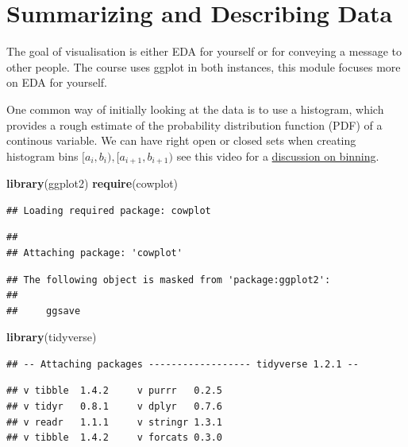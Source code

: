 \documentclass[]{book}
\newenvironment{Shaded}{\begin{snugshade}}{\end{snugshade}}
\newcommand{\KeywordTok}[1]{\textcolor[rgb]{0.13,0.29,0.53}{\textbf{#1}}}
\newcommand{\NormalTok}[1]{#1}
\theoremstyle{definition}
\theoremstyle{definition}
\theoremstyle{definition}
\theoremstyle{remark}
\begin{document}
\section{Summarizing and Describing
Data}\label{summarizing-and-describing-data}

The goal of visualisation is either EDA for yourself or for conveying a
message to other people. The course uses ggplot in both instances, this
module focuses more on EDA for yourself.

One common way of initially looking at the data is to use a histogram,
which provides a rough estimate of the probability distribution function
(PDF) of a continous variable. We can have right open or closed sets
when creating histogram bins \([a_i,b_i), [a_{i+1},b_{i+1})\) see this
video for a \href{https://youtu.be/kREoWbByNZs}{discussion on binning}.

\begin{Shaded}
\begin{Highlighting}[]
\KeywordTok{library}\NormalTok{(ggplot2)}
\KeywordTok{require}\NormalTok{(cowplot)}
\end{Highlighting}
\end{Shaded}

\begin{verbatim}
## Loading required package: cowplot
\end{verbatim}

\begin{verbatim}
## 
## Attaching package: 'cowplot'
\end{verbatim}

\begin{verbatim}
## The following object is masked from 'package:ggplot2':
## 
##     ggsave
\end{verbatim}

\begin{Shaded}
\begin{Highlighting}[]
\KeywordTok{library}\NormalTok{(tidyverse)}
\end{Highlighting}
\end{Shaded}

\begin{verbatim}
## -- Attaching packages ------------------ tidyverse 1.2.1 --
\end{verbatim}

\begin{verbatim}
## v tibble  1.4.2     v purrr   0.2.5
## v tidyr   0.8.1     v dplyr   0.7.6
## v readr   1.1.1     v stringr 1.3.1
## v tibble  1.4.2     v forcats 0.3.0
\end{verbatim}
\end{document}
